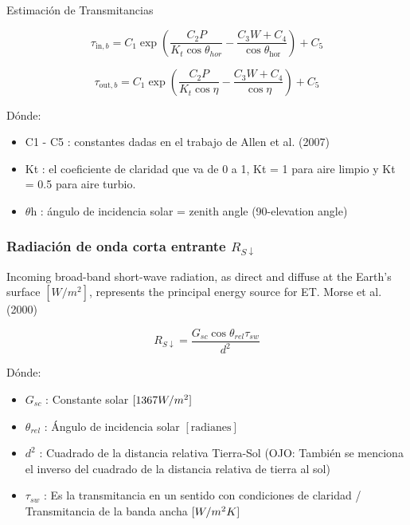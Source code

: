 \newpage
Estimación de Transmitancias

\begin{equation}
\tau_{\text{in},b} = C_1 \exp{
\left( 
  \frac{C_2 P}{K_t \cos{\theta_{hor}}} - \frac{C_3 W + C_4}{\cos{\theta_{\text{hor}}}}
\right) 
} + C_5
\label{eq:1}
\end{equation}

\begin{equation}
\tau_{\text{out},b} = C_1 \exp{
\left( 
  \frac{C_2 P}{K_t \cos{\eta}} - \frac{C_3 W + C_4}{\cos{\eta}}
\right) 
} + C_5
\label{eq:1}
\end{equation}

Dónde:
\begin{itemize}
  \item C1 - C5 : constantes dadas en el trabajo de Allen et al. (2007)
  \item Kt : el coeficiente de claridad que va de 0 a 1, Kt = 1 para aire limpio y Kt = 0.5 para aire turbio.
  \item $\theta$h : ángulo de incidencia solar = zenith angle (90-elevation angle)
\end{itemize}

\vspace{0.4cm}

\subsubsection{Radiación de onda corta entrante $R_{S\downarrow}$}

Incoming broad-band short-wave radiation, as direct and diffuse at the Earth’s surface $[W/m^2]$, represents the principal energy source for ET. Morse et al. (2000)
  
\begin{equation}
R_{S\downarrow} = \frac{G_{sc} \cos\theta_{rel} \tau_{sw}}{d^2}
\label{eq:1}
\end{equation}

Dónde:
\begin{itemize}
    \item $G_{sc}$ : Constante solar $[1367 \space W/m^2]$ 
    \item $\theta_{rel}$ : Ángulo de incidencia solar $[\text{radianes}]$
    \item $d^2$ : Cuadrado de la distancia relativa Tierra-Sol (OJO: También se menciona el inverso del cuadrado de la distancia relativa de tierra al sol)
    \item $\tau_{sw}$ : Es la transmitancia en un sentido con condiciones de claridad / Transmitancia de la banda ancha $[W/m^2 \space K]$
\end{itemize}
  
